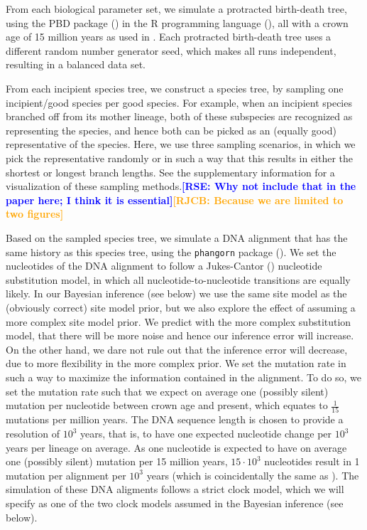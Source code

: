 \documentclass{article}
\newcommand*\RAMPAL[1]{\textcolor{blue}{\textbf{[RSE: #1]}}}
\newcommand*\richel[1]{\textcolor{orange}{\textbf{[RJCB: #1]}}}
\begin{document}
From each biological parameter set, we simulate a protracted birth-death tree,
using the PBD package (\cite{pbd}) in the R programming language (\cite{r}), 
all with a crown age of 15 million years as used in \cite{etienne2014}.
Each protracted birth-death tree uses a different random number
generator seed, which makes all runs independent, resulting in a balanced 
data set. 

From each incipient species tree, we construct a species tree,
by sampling one incipient/good species per good species. 
For example, when an
incipient species branched off from its mother lineage, 
both of these subspecies are recognized as representing the species, 
and hence both can be picked as an (equally good) representative of the species. 
Here, we use three sampling scenarios,
in which we pick the representative randomly or in such a way that this
results in either the shortest or longest branch lengths. 
See the supplementary information for a visualization of these sampling methods.\RAMPAL{Why not include that in the paper here; I think it is essential}\richel{Because we are limited to two figures}

Based on the sampled species tree, we simulate a DNA alignment that has the same history
as this species tree, using the \verb;phangorn; package (\cite{phangorn}). 
We set the nucleotides of the DNA alignment to follow a Jukes-Cantor (\cite{jc69})
nucleotide substitution model, in which all nucleotide-to-nucleotide transitions
are equally likely.
In our Bayesian inference (see below) we use the same site model as the (obviously correct) site model prior,
but we also explore the effect of assuming a more complex site model prior.
We predict with the more complex substitution model, 
that there will be more noise and hence our inference error will increase.
On the other hand, we dare not rule out that the inference error will decrease,
due to more flexibility in the more complex prior.
We set the mutation rate in such a way to maximize the information contained in the alignment.
To do so, we set the mutation rate such that we expect on average one (possibly silent) mutation per nucleotide
between crown age and present, which equates to $\frac{1}{15}$ mutations
per million years.
The DNA sequence length is chosen to provide a
resolution of $10^3$ years, 
that is, to have one expected nucleotide change 
per $10^3$ years per lineage on average. As one nucleotide is expected 
to have on average one (possibly silent) mutation per 15 million years, $15 \cdot 10^3$
nucleotides result in 1 mutation per alignment per $10^3$ years (which is
coincidentally the same as \cite{moller2018}). 
The simulation of these DNA aligments follows a strict clock model, 
which we will specify as one of the two clock models assumed in the Bayesian inference (see below).
\end{document}
